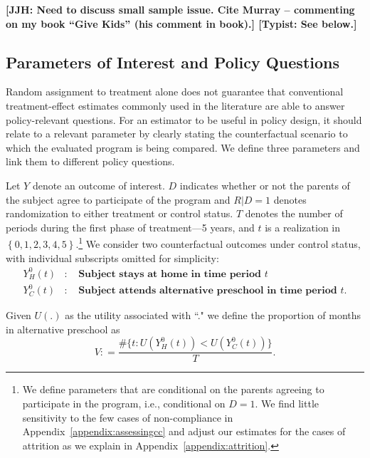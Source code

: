 \textbf{[JJH: Need to discuss small sample issue. Cite Murray -- commenting on my book ``Give Kids'' (his comment in book).] [Typist: See below.]}

\subsection{Parameters of Interest and Policy Questions} \label{section:methodsquestions}

Random assignment to treatment alone does not guarantee that conventional treatment-effect estimates commonly used in the literature are able to answer policy-relevant questions. For an estimator to be useful in policy design, it should relate to a relevant parameter by clearly stating the counterfactual scenario to which the evaluated program is being compared. We define three parameters and link them to different policy questions.

Let $Y$ denote an outcome of interest. $D$ indicates whether or not the parents of the subject agree to participate of the program and $R | D = 1$ denotes randomization to either treatment or control status. $T$ denotes the number of periods during the first phase of treatment---5 years, and $t$ is a realization in $\left\{ 0,1,2,3,4,5 \right\}$.\footnote{We define parameters that are conditional on the parents agreeing to participate in the program, i.e., conditional on $D = 1$. We find little sensitivity to the few cases of non-compliance in Appendix~\ref{appendix:assessingcc} and adjust our estimates for the cases of attrition as we explain in Appendix~\ref{appendix:attrition}.} We consider two counterfactual outcomes under control status, with individual subscripts omitted for simplicity:
\begin{eqnarray}
Y_H^0\left(t \right) &:& \textbf{ Subject stays at home in time period $t$} \nonumber \\
Y_C^0\left(t \right) &:& \textbf{ Subject attends alternative preschool in time period $t$}.  \nonumber
\end{eqnarray}

Given $U(.)$ as the utility associated with ``." we define the proportion of months in alternative preschool as
\begin{equation}
V : = \frac{\# \{ t: U(Y_H^0 \left( t \right)) < U(Y_C^0 \left( t \right)) \} }{T}.
\end{equation}


